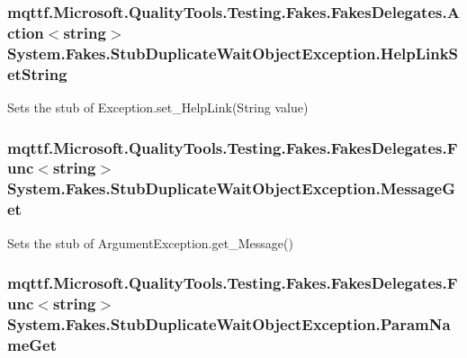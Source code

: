 \hypertarget{class_system_1_1_fakes_1_1_stub_duplicate_wait_object_exception_a624e3213c1d59d174a3bdd20e14a2bcb}{
\subsubsection[{Help\-Link\-Set\-String}]{\setlength{\rightskip}{0pt plus 5cm}mqttf.\-Microsoft.\-Quality\-Tools.\-Testing.\-Fakes.\-Fakes\-Delegates.\-Action$<$string$>$ System.\-Fakes.\-Stub\-Duplicate\-Wait\-Object\-Exception.\-Help\-Link\-Set\-String}}\label{class_system_1_1_fakes_1_1_stub_duplicate_wait_object_exception_a624e3213c1d59d174a3bdd20e14a2bcb}


Sets the stub of Exception.\-set\-\_\-\-Help\-Link(\-String value)

\hypertarget{class_system_1_1_fakes_1_1_stub_duplicate_wait_object_exception_aa751f83646dee8a4a31e3ae4a25bce96}{
\subsubsection[{Message\-Get}]{\setlength{\rightskip}{0pt plus 5cm}mqttf.\-Microsoft.\-Quality\-Tools.\-Testing.\-Fakes.\-Fakes\-Delegates.\-Func$<$string$>$ System.\-Fakes.\-Stub\-Duplicate\-Wait\-Object\-Exception.\-Message\-Get}}\label{class_system_1_1_fakes_1_1_stub_duplicate_wait_object_exception_aa751f83646dee8a4a31e3ae4a25bce96}


Sets the stub of Argument\-Exception.\-get\-\_\-\-Message()

\hypertarget{class_system_1_1_fakes_1_1_stub_duplicate_wait_object_exception_a30182a5bee8d5ba8661244f7e2bb00be}{
\subsubsection[{Param\-Name\-Get}]{\setlength{\rightskip}{0pt plus 5cm}mqttf.\-Microsoft.\-Quality\-Tools.\-Testing.\-Fakes.\-Fakes\-Delegates.\-Func$<$string$>$ System.\-Fakes.\-Stub\-Duplicate\-Wait\-Object\-Exception.\-Param\-Name\-Get}}\label{class_system_1_1_fakes_1_1_stub_duplicate_wait_object_exception_a30182a5bee8d5ba8661244f7e2bb00be}


